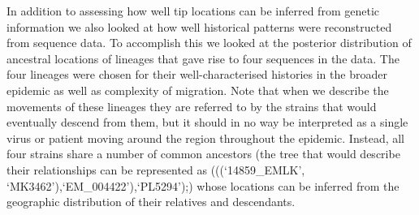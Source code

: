 \documentclass{bmcart}
\begin{document}
In addition to assessing how well tip locations can be inferred from genetic information we also looked at how well historical patterns were reconstructed from sequence data.
To accomplish this we looked at the posterior distribution of ancestral locations of lineages that gave rise to four sequences in the data.
The four lineages were chosen for their well-characterised histories in the broader epidemic as well as complexity of migration.
Note that when we describe the movements of these lineages they are referred to by the strains that would eventually descend from them, but it should in no way be interpreted as a single virus or patient moving around the region throughout the epidemic.
Instead, all four strains share a number of common ancestors (the tree that would describe their relationships can be represented as (((`14859\_EMLK', `MK3462'),`EM\_004422'),`PL5294');) whose locations can be inferred from the geographic distribution of their relatives and descendants.
\end{document}
